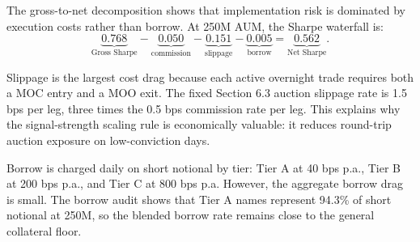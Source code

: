 \documentclass[12pt,a4paper]{article}
\begin{document}
The gross-to-net decomposition shows that implementation risk is dominated by
execution costs rather than borrow. At 250M AUM, the Sharpe waterfall is:
\[
\underbrace{0.768}_{\text{Gross Sharpe}}
-
\underbrace{0.050}_{\text{commission}}
-
\underbrace{0.151}_{\text{slippage}}
-
\underbrace{0.005}_{\text{borrow}}
=
\underbrace{\mathbf{0.562}}_{\text{Net Sharpe}}.
\]

Slippage is the largest cost drag because each active overnight trade requires
both a MOC entry and a MOO exit. The fixed Section 6.3 auction slippage rate is
1.5 bps per leg, three times the 0.5 bps commission rate per leg. This explains
why the signal-strength scaling rule is economically valuable: it reduces
round-trip auction exposure on low-conviction days.

Borrow is charged daily on short notional by tier: Tier A at 40 bps p.a.,
Tier B at 200 bps p.a., and Tier C at 800 bps p.a. However, the aggregate borrow
drag is small. The borrow audit shows that Tier A names represent 94.3\% of short
notional at 250M, so the blended borrow rate remains close to the general
collateral floor.
\end{document}
